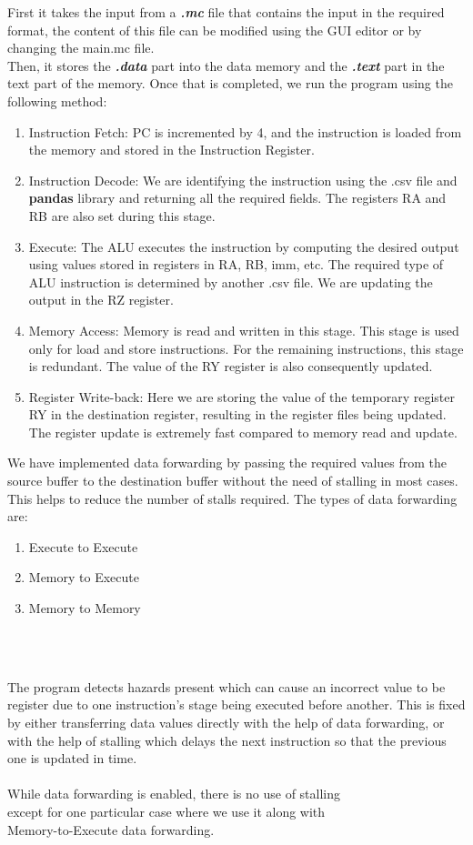 \documentclass{article}
\begin{document}
First it takes the input from a \textsl{\textbf{.mc}} file that contains the input in the required format, the content of this file can be modified using the GUI editor or by changing the main.mc file.\\
Then, it stores the \textsl{\textbf{.data}} part into the data memory and the \textsl{\textbf{.text}} part in the text part of the memory.
Once that is completed, we run the program using the following method:
\begin{enumerate}
\item Instruction Fetch: PC is incremented by 4, and the instruction is loaded from the memory and stored in the Instruction Register.
\item Instruction Decode: We are identifying the instruction using the .csv file and {\bf pandas} library and returning all the required fields. The registers RA and RB are also set during this stage.
\item Execute: The ALU executes the instruction by computing the desired output using values stored in registers in RA, RB, imm, etc. The required type of ALU instruction is determined by another .csv file. We are updating the output in the RZ register.
\item Memory Access: Memory is read and written in this stage. This stage is used only for load and store instructions. For the remaining instructions, this stage is redundant. The value of the RY register is also consequently updated.
\item Register Write-back: Here we are storing the value of the temporary register RY in the destination register, resulting in the register files being updated. The register update is extremely fast compared to memory read and update.
\end{enumerate}
\newpage
We have implemented data forwarding by passing the required values from the source buffer to the destination buffer without the need of stalling in most cases. This helps to reduce the number of stalls required. The types of data forwarding are:
\begin{enumerate}
    \item Execute to Execute
    \item Memory to Execute
    \item Memory to Memory
\end{enumerate}
\\
\vspace{1cm}

\vspace{1cm}\\
The program detects hazards present which can cause an incorrect value to be register due to one instruction's stage being executed before another. This is fixed by either transferring data values directly with the help of data forwarding, or with the help of stalling which delays the next instruction so that the previous one is updated in time.\\\\
While data forwarding is enabled, there is no use of stalling\\ except for one particular case where we use it along with \\Memory-to-Execute data forwarding.
\end{document}
